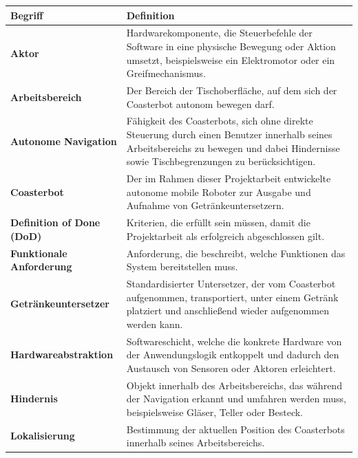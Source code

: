 \begin{longtable}[]{@{}
  >{\raggedright\arraybackslash}p{}
  >{\raggedright\arraybackslash}p{}@{}}
\toprule\noalign{}
\begin{minipage}[b]{\linewidth}\raggedright
Begriff
\end{minipage} & \begin{minipage}[b]{\linewidth}\raggedright
Definition
\end{minipage} \\
\midrule\noalign{}
\endhead
\bottomrule\noalign{}
\endlastfoot
\textbf{Aktor} & Hardwarekomponente, die Steuerbefehle der Software in
eine physische Bewegung oder Aktion umsetzt, beispielsweise ein
Elektromotor oder ein Greifmechanismus. \\
\textbf{Arbeitsbereich} & Der Bereich der Tischoberfläche, auf dem sich
der Coasterbot autonom bewegen darf. \\
\textbf{Autonome Navigation} & Fähigkeit des Coasterbots, sich ohne
direkte Steuerung durch einen Benutzer innerhalb seines Arbeitsbereichs
zu bewegen und dabei Hindernisse sowie Tischbegrenzungen zu
berücksichtigen. \\
\textbf{Coasterbot} & Der im Rahmen dieser Projektarbeit entwickelte
autonome mobile Roboter zur Ausgabe und Aufnahme von
Getränkeuntersetzern. \\
\textbf{Definition of Done (DoD)} & Kriterien, die erfüllt sein müssen,
damit die Projektarbeit als erfolgreich abgeschlossen gilt. \\
\textbf{Funktionale Anforderung} & Anforderung, die beschreibt, welche
Funktionen das System bereitstellen muss. \\
\textbf{Getränkeuntersetzer} & Standardisierter Untersetzer, der vom
Coasterbot aufgenommen, transportiert, unter einem Getränk platziert und
anschließend wieder aufgenommen werden kann. \\
\textbf{Hardwareabstraktion} & Softwareschicht, welche die konkrete
Hardware von der Anwendungslogik entkoppelt und dadurch den Austausch
von Sensoren oder Aktoren erleichtert. \\
\textbf{Hindernis} & Objekt innerhalb des Arbeitsbereichs, das während
der Navigation erkannt und umfahren werden muss, beispielsweise Gläser,
Teller oder Besteck. \\
\textbf{Lokalisierung} & Bestimmung der aktuellen Position des
Coasterbots innerhalb seines Arbeitsbereichs. \\

\end{longtable}
